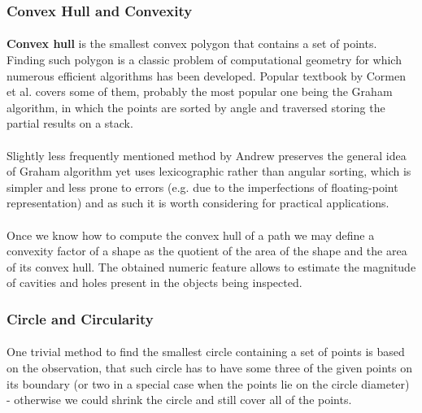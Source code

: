 \subsubsection{Convex Hull and Convexity}

\paragraph*{}
\textbf{Convex hull} is the smallest convex polygon that contains a set of points. Finding such polygon is a classic problem of computational geometry for which numerous efficient algorithms has been developed. Popular textbook by Cormen et al. covers\cite{Cormen01} some of them, probably the most popular one being the Graham algorithm, in which the points are sorted by angle and traversed storing the partial results on a stack.

\paragraph*{}
Slightly less frequently mentioned method\cite{Andrew79} by Andrew preserves the general idea of Graham algorithm yet uses lexicographic rather than angular sorting, which is simpler and less prone to errors (e.g. due to the imperfections of floating-point representation) and as such it is worth considering for practical applications.

\paragraph*{}
Once we know how to compute the convex hull of a path we may define a convexity factor of a shape as the quotient of the area of the shape and the area of its convex hull. The obtained numeric feature allows to estimate the magnitude of cavities and holes present in the objects being inspected.

\subsubsection{Circle and Circularity}

\paragraph*{}
One trivial method to find the smallest circle containing a set of points is based on the observation, that such circle has to have some three of the given points on its boundary (or two in a special case when the points lie on the circle diameter) - otherwise we could shrink the circle and still cover all of the points. 

